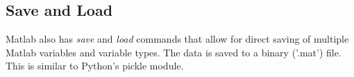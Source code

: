 \pagebreak
\subsection{Save and Load}
Matlab also has \emph{save} and \emph{load} commands that allow for direct saving of multiple Matlab variables and variable types.
 The data is saved to a binary ('.mat') file.
 This is similar to Python's pickle module.

\begin{quote}
 
\end{quote}
